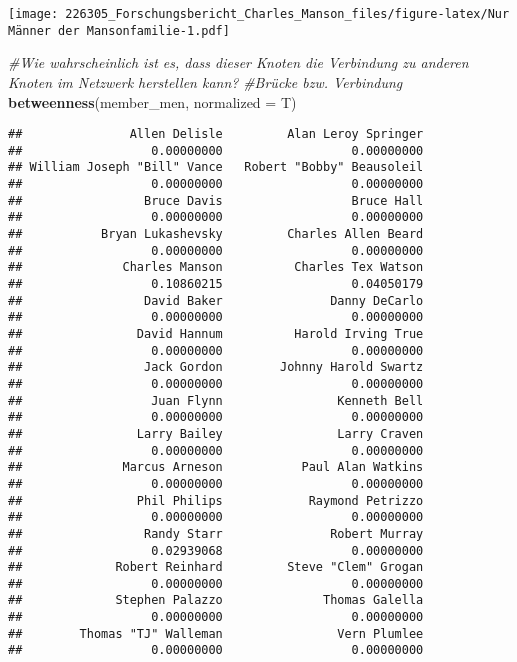 \documentclass[
]{article}
\newenvironment{Shaded}{\begin{snugshade}}{\end{snugshade}}
\newcommand{\CommentTok}[1]{\textcolor[rgb]{0.56,0.35,0.01}{\textit{#1}}}
\newcommand{\DataTypeTok}[1]{\textcolor[rgb]{0.13,0.29,0.53}{#1}}
\newcommand{\KeywordTok}[1]{\textcolor[rgb]{0.13,0.29,0.53}{\textbf{#1}}}
\newcommand{\NormalTok}[1]{#1}
\begin{document}
\texttt{[image: 226305\_Forschungsbericht\_Charles\_Manson\_files/figure-latex/Nur Männer der Mansonfamilie-1.pdf]}

\begin{Shaded}
\begin{Highlighting}[]
\CommentTok{#Wie wahrscheinlich ist es, dass dieser Knoten die Verbindung zu anderen Knoten im Netzwerk herstellen kann? }
\CommentTok{#Brücke bzw. Verbindung}
\KeywordTok{betweenness}\NormalTok{(member_men, }\DataTypeTok{normalized =}\NormalTok{ T)}
\end{Highlighting}
\end{Shaded}

\begin{verbatim}
##               Allen Delisle         Alan Leroy Springer 
##                  0.00000000                  0.00000000 
## William Joseph "Bill" Vance   Robert "Bobby" Beausoleil 
##                  0.00000000                  0.00000000 
##                 Bruce Davis                  Bruce Hall 
##                  0.00000000                  0.00000000 
##           Bryan Lukashevsky         Charles Allen Beard 
##                  0.00000000                  0.00000000 
##              Charles Manson          Charles Tex Watson 
##                  0.10860215                  0.04050179 
##                 David Baker               Danny DeCarlo 
##                  0.00000000                  0.00000000 
##                David Hannum          Harold Irving True 
##                  0.00000000                  0.00000000 
##                 Jack Gordon        Johnny Harold Swartz 
##                  0.00000000                  0.00000000 
##                  Juan Flynn                Kenneth Bell 
##                  0.00000000                  0.00000000 
##                Larry Bailey                Larry Craven 
##                  0.00000000                  0.00000000 
##              Marcus Arneson           Paul Alan Watkins 
##                  0.00000000                  0.00000000 
##                Phil Philips            Raymond Petrizzo 
##                  0.00000000                  0.00000000 
##                 Randy Starr               Robert Murray 
##                  0.02939068                  0.00000000 
##             Robert Reinhard         Steve "Clem" Grogan 
##                  0.00000000                  0.00000000 
##             Stephen Palazzo              Thomas Galella 
##                  0.00000000                  0.00000000 
##        Thomas "TJ" Walleman                Vern Plumlee 
##                  0.00000000                  0.00000000
\end{verbatim}
\end{document}
